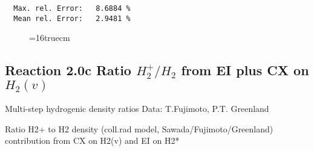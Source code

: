 \documentclass[12pt]{article}
\begin{document}
\begin{small}
\begin{verbatim}
  Max. rel. Error:   8.6884 %
  Mean rel. Error:   2.9481 %
\end{verbatim}\end{small}
\begin{figure} \label{2.0b}
\epsfxsize=16truecm
\end{figure}

\newpage

\subsection{
Reaction 2.0c   Ratio $H_2^+/H_2$ from EI plus CX on $H_2(v)$}

 Multi-step hydrogenic density ratios
 Data: T.Fujimoto, P.T. Greenland


  Ratio H2+ to H2 density
  (coll.rad model, Sawada/Fujimoto/Greenland)
  contribution from CX on H2(v) and EI on H2*
\end{document}
